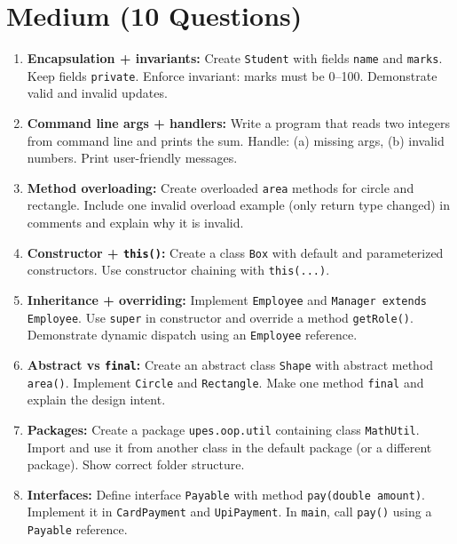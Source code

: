 \documentclass[11pt,a4paper]{article}
\begin{document}
\section*{Medium (10 Questions)}
\begin{enumerate}[label=M\arabic*., leftmargin=*]
  \item \textbf{Encapsulation + invariants:} Create \texttt{Student} with fields \texttt{name} and \texttt{marks}.
    Keep fields \texttt{private}. Enforce invariant: marks must be 0--100.
    Demonstrate valid and invalid updates.

  \item \textbf{Command line args + handlers:} Write a program that reads two integers from command line and prints the sum.
    Handle: (a) missing args, (b) invalid numbers. Print user-friendly messages.

  \item \textbf{Method overloading:} Create overloaded \texttt{area} methods for circle and rectangle.
    Include one invalid overload example (only return type changed) in comments and explain why it is invalid.

  \item \textbf{Constructor + \texttt{this()}:} Create a class \texttt{Box} with default and parameterized constructors.
    Use constructor chaining with \texttt{this(...)}.

  \item \textbf{Inheritance + overriding:} Implement \texttt{Employee} and \texttt{Manager extends Employee}.
    Use \texttt{super} in constructor and override a method \texttt{getRole()}.
    Demonstrate dynamic dispatch using an \texttt{Employee} reference.

  \item \textbf{Abstract vs \texttt{final}:} Create an abstract class \texttt{Shape} with abstract method \texttt{area()}.
    Implement \texttt{Circle} and \texttt{Rectangle}. Make one method \texttt{final} and explain the design intent.

  \item \textbf{Packages:} Create a package \texttt{upes.oop.util} containing class \texttt{MathUtil}.
    Import and use it from another class in the default package (or a different package). Show correct folder structure.

  \item \textbf{Interfaces:} Define interface \texttt{Payable} with method \texttt{pay(double amount)}.
    Implement it in \texttt{CardPayment} and \texttt{UpiPayment}.
    In \texttt{main}, call \texttt{pay()} using a \texttt{Payable} reference.


\end{enumerate}
\end{document}
